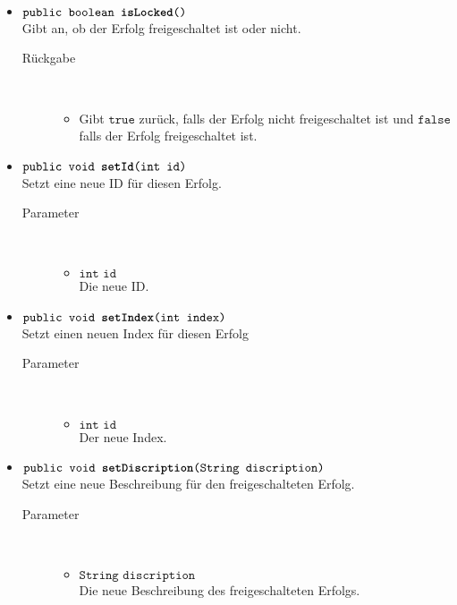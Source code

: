 \begin{description}
\begin{itemize}
\item $\texttt{public boolean \textbf{isLocked}()}$ \\ Gibt an, ob der Erfolg freigeschaltet ist oder nicht.
		\begin{description}
			\item[Rückgabe] \hfill \\
			\vspace{-.8cm}
			\begin{itemize}
				\item Gibt $\texttt{true}$ zurück, falls der Erfolg nicht freigeschaltet ist und $\texttt{false}$ falls der Erfolg freigeschaltet ist.
			\end{itemize}
		\end{description}

	\item $\texttt{public void \textbf{setId}(int id)}$ \\ Setzt eine neue ID für diesen Erfolg.
		\begin{description}
			\item[Parameter] \hfill \\
			\vspace{-.8cm}
			\begin{itemize}
				\item $\texttt{int id}$ \\ Die neue ID.
			\end{itemize}
		\end{description}

	\item $\texttt{public void \textbf{setIndex}(int index)}$ \\ Setzt einen neuen Index für diesen Erfolg
		\begin{description}
			\item[Parameter] \hfill \\
			\vspace{-.8cm}
			\begin{itemize}
				\item $\texttt{int id}$ \\ Der neue Index.
			\end{itemize}
		\end{description}
		
		\item $\texttt{public void \textbf{setDiscription}(String discription)}$ \\ Setzt eine neue Beschreibung für den freigeschalteten Erfolg.
		\begin{description}
			\item[Parameter] \hfill \\
			\vspace{-.8cm}
			\begin{itemize}
				\item $\texttt{String discription}$ \\ Die neue Beschreibung des freigeschalteten Erfolgs.
			\end{itemize}
		\end{description}
		

\end{itemize}
\end{description}
